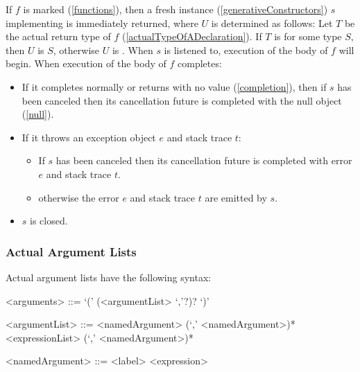\documentclass[makeidx]{article}
\begin{document}
\LMHash{}%
If $f$ is marked \code{\ASYNC*} (\ref{functions}),
then a fresh instance (\ref{generativeConstructors}) $s$
implementing  is immediately returned,
where $U$ is determined as follows:
Let $T$ be the actual return type of $f$ (\ref{actualTypeOfADeclaration}).
If $T$ is  for some type $S$, then $U$ is $S$,
otherwise $U$ is .
When $s$ is listened to, execution of the body of $f$ will begin.
When execution of the body of $f$ completes:
\begin{itemize}
\item If it completes normally or returns with no value (\ref{completion}), then if $s$ has been canceled then its cancellation future is completed with the null object (\ref{null}).
\item If it throws an exception object $e$ and stack trace $t$:
  \begin{itemize}
  \item If $s$ has been canceled then its cancellation future is completed with error $e$ and stack trace $t$.
  \item otherwise the error $e$ and stack trace $t$ are emitted by $s$.
  \end{itemize}
\item $s$ is closed.
\end{itemize}




\subsubsection{Actual Argument Lists}

\LMHash{}%
Actual argument lists have the following syntax:

\begin{grammar}
<arguments> ::= `(' (<argumentList> `,'?)? `)'

<argumentList> ::= <namedArgument> (`,' <namedArgument>)*
  \alt <expressionList> (`,' <namedArgument>)*

<namedArgument> ::= <label> <expression>
\end{grammar}
\end{document}
